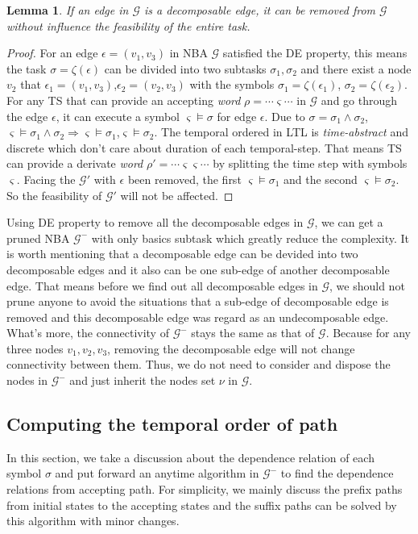 \documentclass[journal]{IEEEtran}
\newtheorem{lemma}{Lemma}
\begin{document}
\begin{lemma}
	 If an edge in $\mathcal{G}$ is a decomposable edge, it can be removed from $\mathcal{G}$ without influence the feasibility of the entire task.
\end{lemma}

\begin{proof}
	For an edge $\epsilon=(v_1,v_3)$ in NBA $\mathcal{G}$ satisfied the DE property, this means the task $\sigma=\zeta(\epsilon)$ can be divided into two subtasks $\sigma_1,\sigma_2$ and there exist a node $v_2$ that $\epsilon_1=(v_1,v_3)$,$\epsilon_2=(v_2,v_3)$ with the symbols $\sigma_1=\zeta(\epsilon_1)$, $\sigma_2=\zeta(\epsilon_2)$. For any TS that can provide an accepting \emph{word} $\rho=\cdots\varsigma\cdots$ in $\mathcal{G}$ and go through the edge $\epsilon$, it can execute a symbol $ \varsigma\models\sigma$ for edge $\epsilon$. Due to $\sigma=\sigma_1\land\sigma_2$, $\varsigma\models\sigma_1\land\sigma_2\Rightarrow\varsigma\models\sigma_1$,$\varsigma\models\sigma_2$.  The temporal ordered in LTL is \emph{time-abstract} and discrete which don't care about duration of each temporal-step. That means TS can provide a derivate \emph{word} $\rho'=\cdots\varsigma\varsigma\cdots$ by splitting the time step with symbols $\varsigma$. Facing the $\mathcal{G}'$ with $\epsilon$ been removed, the first $\varsigma\models\sigma_1$ and the second $\varsigma\models\sigma_2$. So the feasibility of $\mathcal{G}'$ will not be affected.
\end{proof}

Using DE property to remove all the decomposable edges in $\mathcal{G}$, we can get a pruned NBA $\mathcal{G}^{-}$ with only basics subtask which greatly reduce the complexity. It is worth mentioning that a decomposable edge can be devided into two decomposable edges and it also can be one sub-edge of another decomposable edge. That means before we find out all decomposable edges in $\mathcal{G}$, we should not prune anyone to avoid the situations that a sub-edge of decomposable edge is removed and this decomposable edge was regard as an undecomposable edge.
What's more, the connectivity of $\mathcal{G}^-$ stays the same as that of $\mathcal{G}$. Because for any three nodes $v_1,v_2,v_3$, removing the decomposable edge will not change connectivity between them. Thus, we do not need to consider and dispose the nodes in $\mathcal{G}^-$ and just inherit the nodes set $\nu$ in $\mathcal{G}$.

\subsection{Computing the temporal order of path}
In this section, we take a discussion about the dependence relation of each symbol $\sigma$ and put forward an anytime algorithm in $\mathcal{G}^-$ to find the dependence relations from accepting path. For simplicity, we mainly discuss the prefix paths from initial states to the accepting states and the suffix paths can be solved by this algorithm with minor changes.
\end{document}

